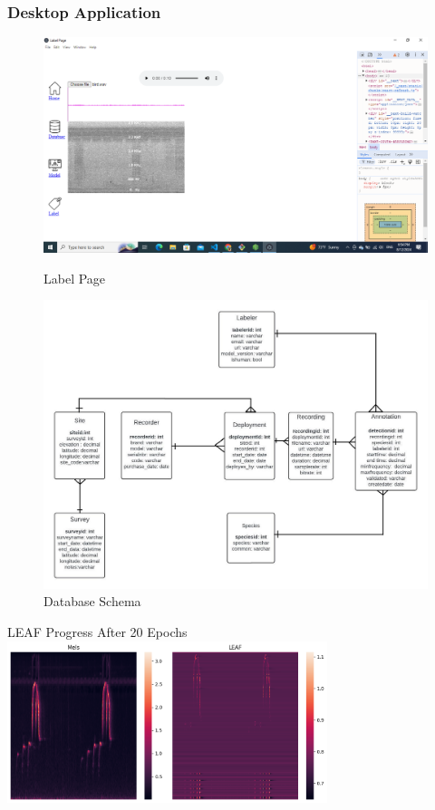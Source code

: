 \begin{frame}
    \frametitle{Desktop Application}

    \begin{figure}
        \centering
        \begin{minipage}{0.48\textwidth}
            \centering
            \includegraphics[width=\textwidth]{label.png}
            \caption{Label Page}
        \end{minipage}
        \hfill
        \begin{minipage}{0.48\textwidth}
            \centering
            \includegraphics[width=\textwidth]{database.jpg}
            \caption{Database Schema}
        \end{minipage}
    \end{figure}

\end{frame}


\begin{frame}{LEAF Progress}
    \centering
    After 20 Epochs
    \break
    \includegraphics[height=0.7\textheight,width=0.7\textwidth,keepaspectratio]{images/LEAF_20.png}
\end{frame}

